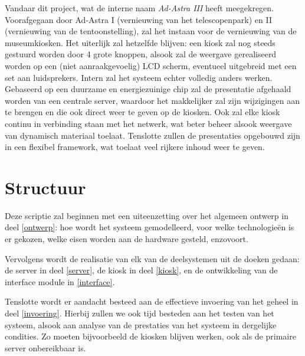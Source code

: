 Vandaar dit project, wat de interne naam \emph{Ad-Astra III} heeft meegekregen. Voorafgegaan door Ad-Astra I (vernieuwing van het telescopenpark) en II (vernieuwing van de tentoonstelling), zal het instaan voor de vernieuwing van de museumkiosken. Het uiterlijk zal hetzelfde blijven: een kiosk zal nog steeds gestuurd worden door 4 grote knoppen, alsook zal de weergave gerealiseerd worden op een (niet aanraakgevoelig) LCD scherm, eventueel uitgebreid met een set aan luidsprekers.
Intern zal het systeem echter volledig anders werken. Gebaseerd op een duurzame en energiezuinige chip zal de presentatie afgehaald worden van een centrale server, waardoor het makkelijker zal zijn wijzigingen aan te brengen en die ook direct weer te geven op de kiosken. Ook zal elke kiosk continu in verbinding staan met het netwerk, wat beter beheer alsook weergave van dynamisch materiaal toelaat. Tenslotte zullen de presentaties opgebouwd zijn in een flexibel framework, wat toelaat veel rijkere inhoud weer te geven.


%
%

\chapter{Structuur}
\label{chat:structuur}

Deze scriptie zal beginnen met een uiteenzetting over het algemeen ontwerp in deel \ref{ontwerp}: hoe wordt het systeem gemodelleerd, voor welke technologieën is er gekozen, welke eisen worden aan de hardware gesteld, enzovoort.

Vervolgens wordt de realisatie van elk van de deelsystemen uit de doeken gedaan: de server in deel \ref{server}, de kiosk in deel \ref{kiosk}, en de ontwikkeling van de interface module in \ref{interface}.

Tenslotte wordt er aandacht besteed aan de effectieve invoering van het geheel in deel \ref{invoering}. Hierbij zullen we ook tijd besteden aan het testen van het systeem, alsook aan analyse van de prestaties van het systeem in dergelijke condities. Zo moeten bijvoorbeeld de kiosken blijven werken, ook als de primaire server onbereikbaar is.
